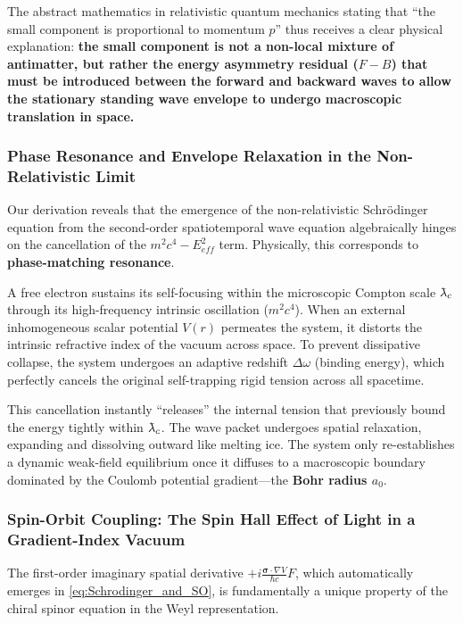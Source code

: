 \documentclass[12pt, a4paper]{article}
\newcommand{\lambdabar}{{\mkern0.75mu\mathchar '26\mkern -9.75mu\lambda}}
\begin{document}
The abstract mathematics in relativistic quantum mechanics stating that ``the small component is proportional to momentum $p$'' thus receives a clear physical explanation: \textbf{the small component is not a non-local mixture of antimatter, but rather the energy asymmetry residual ($F-B$) that must be introduced between the forward and backward waves to allow the stationary standing wave envelope to undergo macroscopic translation in space.}

\subsubsection{Phase Resonance and Envelope Relaxation in the Non-Relativistic Limit}

Our derivation reveals that the emergence of the non-relativistic Schrödinger equation from the second-order spatiotemporal wave equation algebraically hinges on the cancellation of the $m^2c^4 - E_{eff}^2$ term. Physically, this corresponds to \textbf{phase-matching resonance}.

A free electron sustains its self-focusing within the microscopic Compton scale $\lambdabar_c$ through its high-frequency intrinsic oscillation ($m^2c^4$). When an external inhomogeneous scalar potential $V(r)$ permeates the system, it distorts the intrinsic refractive index of the vacuum across space. To prevent dissipative collapse, the system undergoes an adaptive redshift $\Delta \omega$ (binding energy), which perfectly cancels the original self-trapping rigid tension across all spacetime.

This cancellation instantly ``releases'' the internal tension that previously bound the energy tightly within $\lambdabar_c$. The wave packet undergoes spatial relaxation, expanding and dissolving outward like melting ice. The system only re-establishes a dynamic weak-field equilibrium once it diffuses to a macroscopic boundary dominated by the Coulomb potential gradient---the \textbf{Bohr radius $a_0$}.

\subsubsection{Spin-Orbit Coupling: The Spin Hall Effect of Light in a Gradient-Index Vacuum}

The first-order imaginary spatial derivative $+i\frac{\boldsymbol{\sigma} \cdot \nabla V}{\hbar c} F$, which automatically emerges in \eqref{eq:Schrodinger_and_SO}, is fundamentally a unique property of the chiral spinor equation in the Weyl representation.
\end{document}
